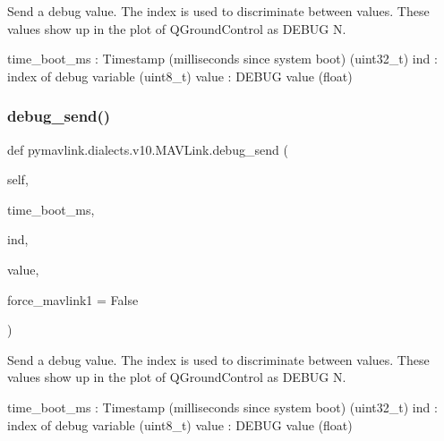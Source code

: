 \begin{DoxyVerb}
\begin{DoxyVerb}
\begin{DoxyVerb}Send a debug value. The index is used to discriminate between values.
These values show up in the plot of QGroundControl as
DEBUG N.

time_boot_ms              : Timestamp (milliseconds since system boot) (uint32_t)
ind                       : index of debug variable (uint8_t)
value                     : DEBUG value (float)\end{DoxyVerb}
 \mbox{\label{classpymavlink_1_1dialects_1_1v10_1_1MAVLink_a8c49b6c3568c9d1a4e74b540f2612ff8}} 
\subsubsection{\texorpdfstring{debug\+\_\+send()}{debug\_send()}}
{\footnotesize\ttfamily def pymavlink.\+dialects.\+v10.\+M\+A\+V\+Link.\+debug\+\_\+send (\begin{DoxyParamCaption}\item[{}]{self,  }\item[{}]{time\+\_\+boot\+\_\+ms,  }\item[{}]{ind,  }\item[{}]{value,  }\item[{}]{force\+\_\+mavlink1 = {\ttfamily False} }\end{DoxyParamCaption})}

\begin{DoxyVerb}Send a debug value. The index is used to discriminate between values.
These values show up in the plot of QGroundControl as
DEBUG N.

time_boot_ms              : Timestamp (milliseconds since system boot) (uint32_t)
ind                       : index of debug variable (uint8_t)
value                     : DEBUG value (float)\end{DoxyVerb}
 \mbox{\label{classpymavlink_1_1dialects_1_1v10_1_1MAVLink_a060dd2151e7ac5772147b545bf78bb88}} 

\end{DoxyVerb}
\end{DoxyVerb}
